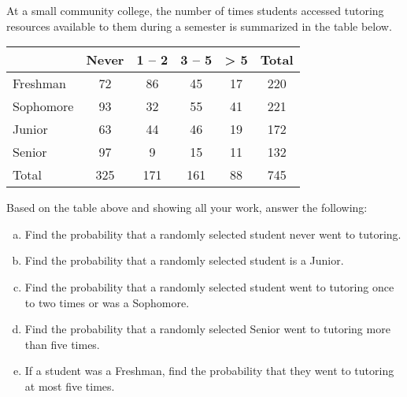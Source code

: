 \documentclass[11pt,letterpaper]{article}
\begin{document}
\newpage



 At a small community college, the number of times students accessed tutoring resources available to them during a semester is summarized in the table below. \par
	\begin{table}[!ht]
	\centering
	\begin{tabular}{|l||c|c|c|c||c|} \hline
	& Never & 1 -- 2 & 3 -- 5 & > 5 & Total \\ \hline \hline
	Freshman & 72 & 86 & 45 & 17 & 220 \\ \hline
	Sophomore & 93 & 32 & 55 & 41 & 221 \\ \hline
	Junior & 63 & 44 & 46 & 19 & 172 \\ \hline
	Senior & 97 & 9 & 15 & 11 & 132 \\ \hline \hline
	Total & 325 & 171 & 161 & 88 & 745 \\ \hline
	\end{tabular}
	\end{table} \par
Based on the table above and showing all your work, answer the following:
\begin{enumerate}[(a)]
\item Find the probability that a randomly selected student never went to tutoring.
\item Find the probability that a randomly selected student is a Junior.
\item Find the probability that a randomly selected student went to tutoring once to two times or was a Sophomore. 
\item Find the probability that a randomly selected Senior went to tutoring more than five times. 
\item If a student was a Freshman, find the probability that they went to tutoring at most five times. 
\end{enumerate} \pspace
\end{document}
